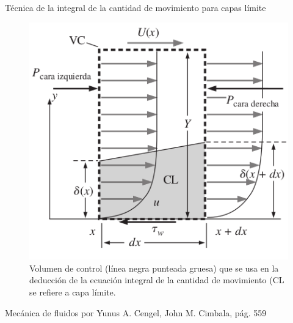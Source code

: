 \begin{frame}{Técnica de la integral de la cantidad de movimiento para capas límite}
\begin{figure}[H]
\centering
\includegraphics[scale=0.25]{Section_Files/S3-imagenes-Jhon/0259.png}
\caption{Volumen de control (línea negra punteada gruesa) que se usa en la deducción de la ecuación integral de la cantidad de movimiento (CL se refiere a capa límite.}
\end{figure}
{\tiny Mecánica de fluidos por Yunus A. Cengel, John M. Cimbala, pág. 559}
\end{frame}